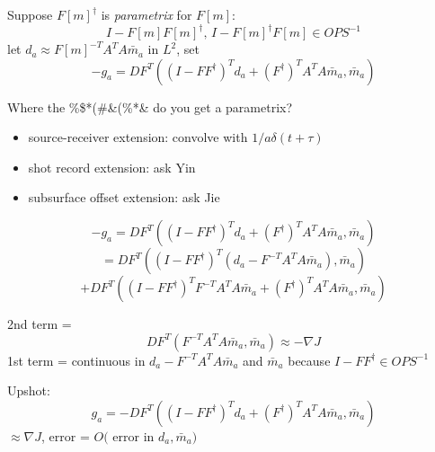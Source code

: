 \documentclass[xcolor=dvipsnames,20pt,aspectratio=169]{beamer}
\newcommand{\om}{\bar{m}}
\begin{document}
\begin{frame}
Suppose $F[m]^{\dagger}$ is {\em parametrix} for $F[m]$:
\[
I-F[m]F[m]^{\dagger},\, I-F[m]^{\dagger}F[m] \in OPS^{-1}
\]
let $d_a \approx F[m]^{-T}A^TA\om_a$ in $L^2$, set
\[
-g_a = DF^T((I-FF^{\dagger})^Td_a + (F^{\dagger})^TA^TA\om_a, \om_a) 
\]
\end{frame}

\begin{frame}
Where the \%\$*(\#\&(\%*\& do you get a parametrix?
\begin{itemize}
\item source-receiver extension: convolve with $1/a \delta(t+\tau)$
\item shot record extension: ask Yin
\item subsurface offset extension: ask Jie
\end{itemize}
\end{frame}
 
\begin{frame}
\[
-g_a = DF^T((I-FF^{\dagger})^Td_a + (F^{\dagger})^TA^TA\om_a, \om_a) 
\]
\[
= DF^T((I-FF^{\dagger})^T(d_a-F^{-T}A^TA\om_a),\om_a)
\]
\[
+ DF^T((I-FF^{\dagger})^TF^{-T}A^TA\om_a + (F^{\dagger})^TA^TA\om_a ,\om_a)
\]
\end{frame}
\begin{frame}
2nd term = 
\[
DF^T(F^{-T}A^TA\om_a,\om_a) \approx -\nabla J
\]
1st term = continuous in $d_a-F^{-T}A^TA\om_a$ and $\om_a$ because 
$I-FF^{\dagger} \in OPS^{-1}$
\end{frame}

\begin{frame}
Upshot: 
\[
g_a = -DF^T((I-FF^{\dagger})^Td_a + (F^{\dagger})^TA^TA\om_a, \om_a)
\]
$\approx \nabla J$, error = $O($ error in $d_a, \om_a)$
\end{frame}
\end{document}
